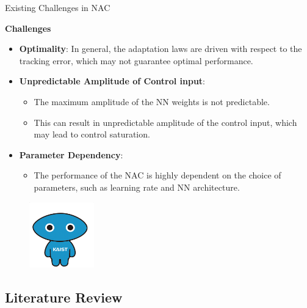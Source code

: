 \documentclass[8pt, aspectratio=169]{beamer}
\begin{document}
\begin{frame}{\insertsubsectionhead}{Existing Challenges in NAC}
  
  \textbf{Challenges}
  \small{
    \begin{itemize}
      \item \textbf{Optimality}: In general, the adaptation laws are driven with respect to the tracking error, which may not guarantee optimal performance.
      \item \textbf{Unpredictable Amplitude of Control input}: 
        \begin{itemize}
          \item The maximum amplitude of the NN weights is not predictable.
          \item This can result in unpredictable amplitude of the control input, which may lead to control saturation.
        \end{itemize}
      \item \textbf{Parameter Dependency}: 
      \begin{itemize}
        \item The performance of the NAC is highly dependent on the choice of parameters, such as learning rate and NN architecture.
      \end{itemize}
    \end{itemize}
  }

  \begin{figure}
    \includegraphics[width=0.25\textwidth]{figures/KAIST-hi.png}
  \end{figure}

\end{frame}

\subsection{Literature Review}
\end{document}
